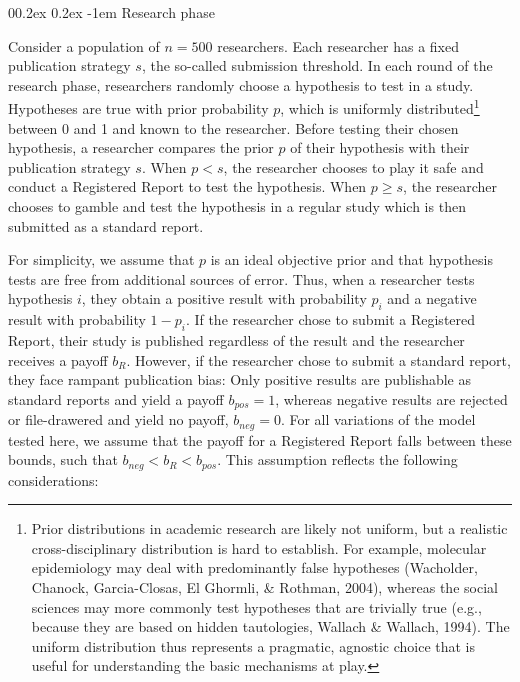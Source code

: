 \documentclass[
  british,
  a4paper,
  ,man,mask,floatsintext]{apa6}
\makeatletter
\let\oldparagraph\paragraph
\renewcommand{\paragraph}{
    \@ifstar
      \xxxParagraphStar
      \xxxParagraphNoStar
  }
\newcommand{\xxxParagraphStar}[1]{\oldparagraph*{#1}\mbox{}}
\newcommand{\xxxParagraphNoStar}[1]{\oldparagraph{#1}\mbox{}}
\renewcommand{\paragraph}{\@startsection{paragraph}{4}{\parindent}%
  {0\baselineskip \@plus 0.2ex \@minus 0.2ex}%
  {-1em}%
  {\normalfont\normalsize\bfseries\itshape\typesectitle}}
\makeatother
\begin{document}
\paragraph{Research phase}\label{research-phase}

Consider a population of \(n = 500\) researchers.
Each researcher has a fixed publication strategy \(s\), the so-called submission threshold.
In each round of the research phase, researchers randomly choose a hypothesis to test in a study.
Hypotheses are true with prior probability \(p\), which is uniformly distributed\footnote{Prior distributions in academic research are likely not uniform, but a realistic cross-disciplinary distribution is hard to establish. For example, molecular epidemiology may deal with predominantly false hypotheses (Wacholder, Chanock, Garcia-Closas, El Ghormli, \& Rothman, 2004), whereas the social sciences may more commonly test hypotheses that are trivially true (e.g., because they are based on hidden tautologies, Wallach \& Wallach, 1994). The uniform distribution thus represents a pragmatic, agnostic choice that is useful for understanding the basic mechanisms at play.} between 0 and 1 and known to the researcher.
Before testing their chosen hypothesis, a researcher compares the prior \(p\) of their hypothesis with their publication strategy \(s\).
When \(p < s\), the researcher chooses to play it safe and conduct a Registered Report to test the hypothesis.
When \(p \geq s\), the researcher chooses to gamble and test the hypothesis in a regular study which is then submitted as a standard report.

For simplicity, we assume that \(p\) is an ideal objective prior and that hypothesis tests are free from additional sources of error.
Thus, when a researcher tests hypothesis \(i\), they obtain a positive result with probability \(p_i\) and a negative result with probability \(1-p_i\).
If the researcher chose to submit a Registered Report, their study is published regardless of the result and the researcher receives a payoff \(b_{R}\).
However, if the researcher chose to submit a standard report, they face rampant publication bias:
Only positive results are publishable as standard reports and yield a payoff \(b_{pos} = 1\), whereas negative results are rejected or file-drawered and yield no payoff, \(b_{neg} = 0\).
For all variations of the model tested here, we assume that the payoff for a Registered Report falls between these bounds, such that \(b_{neg} < b_{R} < b_{pos}\).
This assumption reflects the following considerations:
\end{document}

